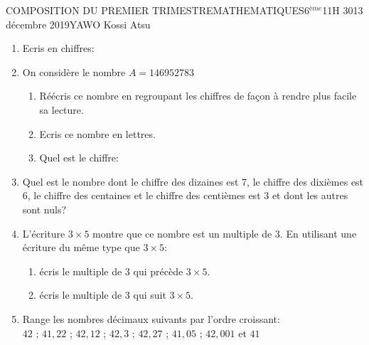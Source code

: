 \documentclass[12pt,a4paper]{book}
\newcommand{\prof}{YAWO Kossi Atsu}
\newcommand{\matiere}{MATHEMATIQUES}
\newcommand{\classe}{6$^{ème}$}
\begin{document}
\begin{devoir}{COMPOSITION DU PREMIER TRIMESTRE}{\matiere}{\classe}{1}{1H 30}{13 décembre 2019}{\prof}
\begin{exo}[8]
\begin{multicols}{2}
\begin{enumerate}
\item Ecris en chiffres:
\item On considère le nombre $A=146952783$
\begin{enumerate}
\item Réécris ce nombre en regroupant les chiffres de façon à rendre plus facile sa lecture.
\item Ecris ce nombre en lettres.
\item Quel est le chiffre:
\end{enumerate}
\item Quel est le nombre dont le chiffre des dizaines est 7, le chiffre des dixièmes est 6, le chiffre des centaines et le chiffre des centièmes est 3 et dont les autres sont nuls?
\item L'écriture $3 \times 5$ montre que ce nombre est un multiple de 3. En utilisant une écriture du même type que $3 \times 5$:
\begin{enumerate}
\item écris le multiple de 3 qui précède $3 \times 5$.
\item écris le multiple de 3 qui suit $3 \times 5$.
\end{enumerate}
\item Range les nombres décimaux suivants par l'ordre croissant:\\
$42$ \qquad ; \qquad $41,22$ \qquad ; \qquad $42,12$ \qquad ; \qquad $42,3$ \qquad ; \qquad $42,27$ \qquad ; \qquad $41,05$ \qquad ; \qquad $42,001$ \qquad et \qquad $41$
\end{enumerate}
\end{multicols}
\end{exo}


\end{devoir}
\end{document}
